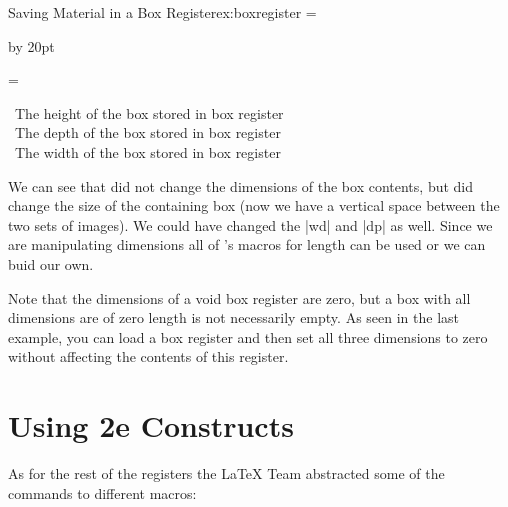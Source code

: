 \begin{texexample}{Saving Material in a Box Register}{ex:boxregister}
\scratchdimen=\ht\lenna

\advance\scratchdimen  by 20pt\relax



\ht\lenna=\scratchdimen

\copy\lenna

\unvbox\lenna
\the\ht\lenna\ The height of the box stored in box register\\
\the\dp\lenna\ The depth of the box stored in box register\\
\the\wd\lenna\ The width of the box stored in box register\\ 
\end{texexample}

We can see that \tex did not change the dimensions of the box contents, but did change the size of the containing box (now we have a vertical space between the two sets of images). We could have changed the |wd| and |dp| as well. Since we are manipulating dimensions all of \latexe's macros for length can be used or we can buid our own.


Note that the dimensions of a void box register are zero, but a box with all dimensions 
are of zero length is not necessarily empty.  As seen in the last example, you can load a box register and then set all three dimensions to zero without affecting the contents of this register. 


\section{Using \latex2e Constructs}

As for the rest of the registers the LaTeX Team abstracted  some of the commands to different macros:


